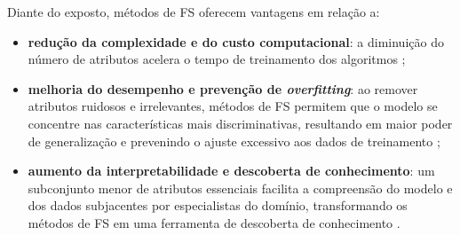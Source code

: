 Diante do exposto, métodos de FS oferecem vantagens em relação a:
\begin{itemize}
    \item \textbf{redução da complexidade e do custo computacional}: a diminuição do número de atributos acelera o tempo de treinamento dos algoritmos \cite{Theng2024};
    
    \item \textbf{melhoria do desempenho e prevenção de \textit{overfitting}}: ao remover atributos ruidosos e irrelevantes, métodos de FS permitem que o modelo se concentre nas características mais discriminativas, resultando em maior poder de generalização e prevenindo o ajuste excessivo aos dados de treinamento \cite{Dhal2022};
    
    \item \textbf{aumento da interpretabilidade e descoberta de conhecimento}: um subconjunto menor de atributos essenciais facilita a compreensão do modelo e dos dados subjacentes por especialistas do domínio, transformando os métodos de FS em uma ferramenta de descoberta de conhecimento \cite{Dhal2022,KHAIRE20221060}.
\end{itemize}

